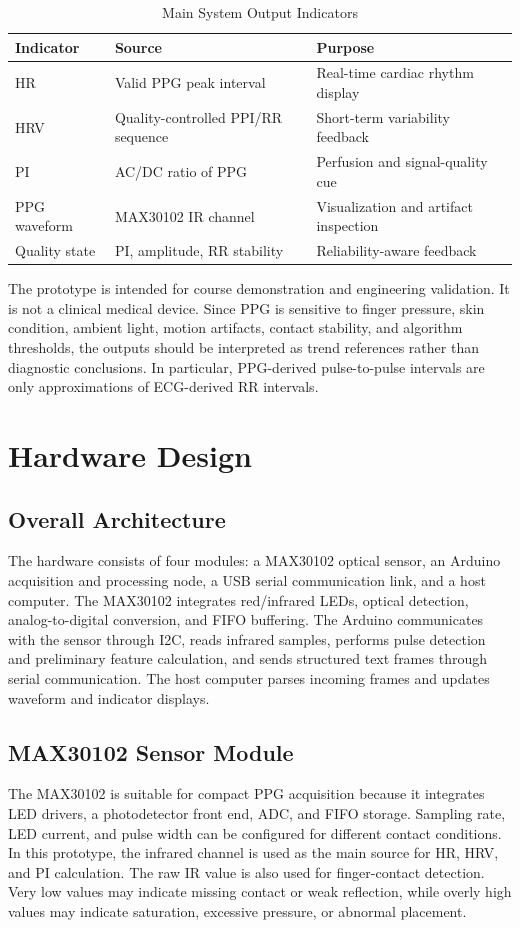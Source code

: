 \documentclass[10pt,conference]{IEEEtran}
\begin{document}
\begin{table}[t]
\centering
\caption{Main System Output Indicators}
\label{tab:targets}
\begin{tabular}{p{1.7cm}p{2.5cm}p{3.1cm}}
\toprule
\textbf{Indicator} & \textbf{Source} & \textbf{Purpose} \\
\midrule
HR & Valid PPG peak interval & Real-time cardiac rhythm display \\
HRV & Quality-controlled PPI/RR sequence & Short-term variability feedback \\
PI & AC/DC ratio of PPG & Perfusion and signal-quality cue \\
PPG waveform & MAX30102 IR channel & Visualization and artifact inspection \\
Quality state & PI, amplitude, RR stability & Reliability-aware feedback \\
\bottomrule
\end{tabular}
\end{table}

The prototype is intended for course demonstration and engineering validation. It is not a clinical medical device. Since PPG is sensitive to finger pressure, skin condition, ambient light, motion artifacts, contact stability, and algorithm thresholds, the outputs should be interpreted as trend references rather than diagnostic conclusions. In particular, PPG-derived pulse-to-pulse intervals are only approximations of ECG-derived RR intervals.

\section{Hardware Design}
\subsection{Overall Architecture}
The hardware consists of four modules: a MAX30102 optical sensor, an Arduino acquisition and processing node, a USB serial communication link, and a host computer. The MAX30102 integrates red/infrared LEDs, optical detection, analog-to-digital conversion, and FIFO buffering. The Arduino communicates with the sensor through I2C, reads infrared samples, performs pulse detection and preliminary feature calculation, and sends structured text frames through serial communication. The host computer parses incoming frames and updates waveform and indicator displays.

\subsection{MAX30102 Sensor Module}
The MAX30102 is suitable for compact PPG acquisition because it integrates LED drivers, a photodetector front end, ADC, and FIFO storage. Sampling rate, LED current, and pulse width can be configured for different contact conditions. In this prototype, the infrared channel is used as the main source for HR, HRV, and PI calculation. The raw IR value is also used for finger-contact detection. Very low values may indicate missing contact or weak reflection, while overly high values may indicate saturation, excessive pressure, or abnormal placement.
\end{document}
